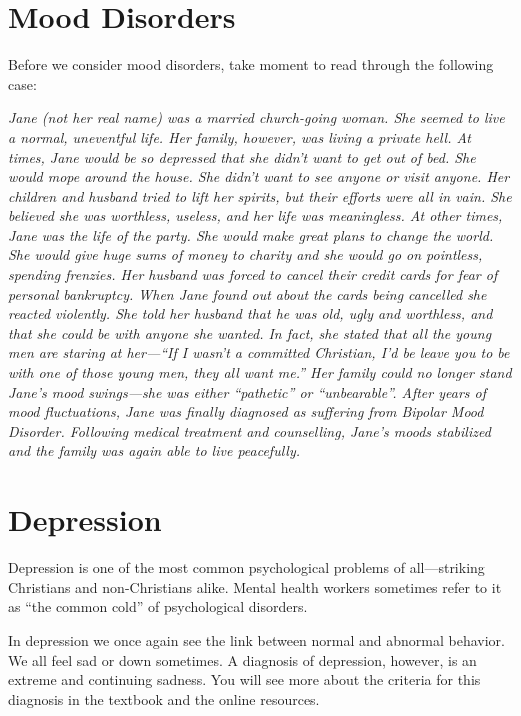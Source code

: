 \documentclass[
]{book}
\begin{document}
\hypertarget{mood-disorders}{%
\section{Mood Disorders}\label{mood-disorders}}

Before we consider mood disorders, take moment to read through the following case:

\emph{Jane (not her real name) was a married church-going woman. She seemed to live a normal, uneventful life. Her family, however, was living a private hell. At times, Jane would be so depressed that she didn't want to get out of bed. She would mope around the house. She didn't want to see anyone or visit anyone. Her children and husband tried to lift her spirits, but their efforts were all in vain. She believed she was worthless, useless, and her life was meaningless. At other times, Jane was the life of the party. She would make great plans to change the world. She would give huge sums of money to charity and she would go on pointless, spending frenzies. Her husband was forced to cancel their credit cards for fear of personal bankruptcy. When Jane found out about the cards being cancelled she reacted violently. She told her husband that he was old, ugly and worthless, and that she could be with anyone she wanted. In fact, she stated that all the young men are staring at her---``If I wasn't a committed Christian, I'd be leave you to be with one of those young men, they all want me.'' Her family could no longer stand Jane's mood swings---she was either ``pathetic'' or ``unbearable''. After years of mood fluctuations, Jane was finally diagnosed as suffering from Bipolar Mood Disorder. Following medical treatment and counselling, Jane's moods stabilized and the family was again able to live peacefully.}

\hypertarget{depression}{%
\section{Depression}\label{depression}}

Depression is one of the most common psychological problems of all---striking Christians and non-Christians alike. Mental health workers sometimes refer to it as ``the common cold'' of psychological disorders.

In depression we once again see the link between normal and abnormal behavior. We all feel sad or down sometimes. A diagnosis of depression, however, is an extreme and continuing sadness. You will see more about the criteria for this diagnosis in the textbook and the online resources.
\end{document}
